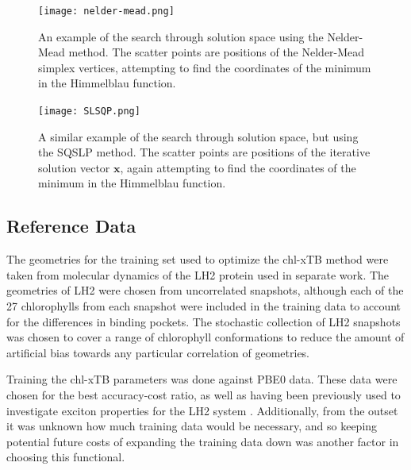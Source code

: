 \begin{figure}
    \centering
    \texttt{[image: nelder-mead.png]}
    \caption{An example of the search through solution space using the Nelder-Mead
    method. The scatter points are positions of the Nelder-Mead simplex vertices,
    attempting to find the coordinates of the minimum in the Himmelblau function.}
    \label{fig:nelder_mead}
\end{figure}

\begin{figure}
    \centering
    \texttt{[image: SLSQP.png]}
    \caption{A similar example of the search through solution space, but using the
    SQSLP method. The scatter points are positions of the iterative solution vector
    $\mathbf{x}$, again attempting to find the coordinates of the minimum in the 
    Himmelblau function.}
    \label{fig:slsqp}
\end{figure}

\subsection{Reference Data}
\label{subsec:ref_data}
The geometries for the training set used to optimize the chl-xTB method were taken
from molecular dynamics of the LH2 protein used in separate work\cite{Stross2016}. 
The geometries of LH2 were chosen from uncorrelated snapshots, although each of
the 27 chlorophylls from each snapshot were included in the training data to account
for the differences in binding pockets. The stochastic collection of LH2 snapshots
was chosen to cover a range of chlorophyll conformations to reduce the amount of
artificial bias towards any particular correlation of geometries.

Training the chl-xTB parameters was done against PBE0 data. These data were chosen
for the best accuracy-cost ratio, as well as having been previously used to investigate
exciton properties for the LH2 system \cite{Stross2016}. Additionally, from the
outset it was unknown how much training data would be necessary, and so keeping 
potential future costs of expanding the training data down was another factor in 
choosing this functional.


